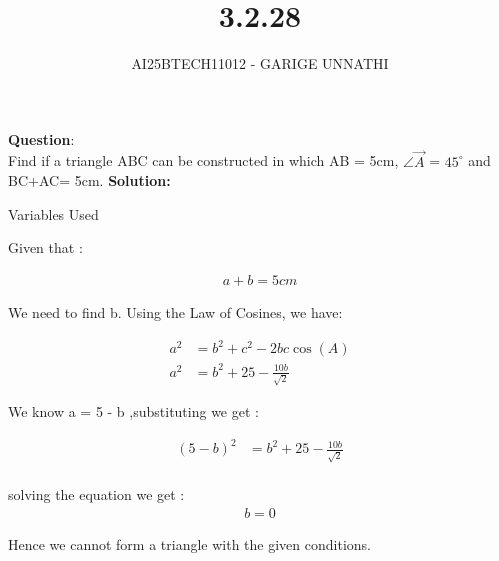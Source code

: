 \documentclass[journal]{IEEEtran}
\begin{document}

\vspace{3cm}

\title{3.2.28}
\author{AI25BTECH11012 - GARIGE UNNATHI}
{\let\newpage\relax\maketitle}


\renewcommand{\thefigure}{\theenumi}
\renewcommand{\thetable}{\theenumi}
\setlength{\intextsep}{10pt} %


\renewcommand{\thetable}{\theenumi}


\textbf{Question}:\\
Find if a triangle ABC can be constructed in which AB = 5cm, $\angle \vec{A}$ = $45^\circ$ and BC+AC= 5cm.
\textbf{Solution: }

 \begin{table}[h!]    
      \centering
      
      \caption{Variables Used}
      \label{}
    \end{table}

Given that : 

\begin{align*}
  a + b = 5 cm
\end{align*}

We need to find b. Using the Law of Cosines, we have:


\begin{align}
 a^2 &= b^2 + c^2 - 2bc \cos(A) \\
 a^2 &= b^2 + 25 - \frac{10b}{\sqrt{2}}
 \end{align}


We know a = 5 - b ,substituting we get :

\begin{align}
 (5 - b)^2 &= b^2 + 25 - \frac{10b}{\sqrt{2}}\\
 \end{align}

solving the equation we get :
\begin{align}
b = 0
\end{align}

\bigskip
Hence we cannot form a triangle with the given conditions.
\end{document}
